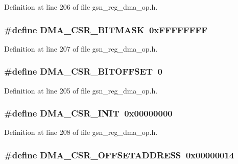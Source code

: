 Definition at line 206 of file gsn\_\-reg\_\-dma\_\-op.h.

\hypertarget{a00547_ae27eb5f31031160b8c236fdedc4e6bab}{
\subsubsection[{DMA\_\-CSR\_\-BITMASK}]{\setlength{\rightskip}{0pt plus 5cm}\#define DMA\_\-CSR\_\-BITMASK~0xFFFFFFFF}}
\label{a00547_ae27eb5f31031160b8c236fdedc4e6bab}


Definition at line 207 of file gsn\_\-reg\_\-dma\_\-op.h.

\hypertarget{a00547_a60aa2a57bebc64a52d6f59cae5992e24}{
\subsubsection[{DMA\_\-CSR\_\-BITOFFSET}]{\setlength{\rightskip}{0pt plus 5cm}\#define DMA\_\-CSR\_\-BITOFFSET~0}}
\label{a00547_a60aa2a57bebc64a52d6f59cae5992e24}


Definition at line 205 of file gsn\_\-reg\_\-dma\_\-op.h.

\hypertarget{a00547_addd2e3f858b46b2a67caa2010fef501d}{
\subsubsection[{DMA\_\-CSR\_\-INIT}]{\setlength{\rightskip}{0pt plus 5cm}\#define DMA\_\-CSR\_\-INIT~0x00000000}}
\label{a00547_addd2e3f858b46b2a67caa2010fef501d}


Definition at line 208 of file gsn\_\-reg\_\-dma\_\-op.h.

\hypertarget{a00547_ab811917abbde7042aac98e5cd68a2b57}{
\subsubsection[{DMA\_\-CSR\_\-OFFSETADDRESS}]{\setlength{\rightskip}{0pt plus 5cm}\#define DMA\_\-CSR\_\-OFFSETADDRESS~0x00000014}}
\label{a00547_ab811917abbde7042aac98e5cd68a2b57}


